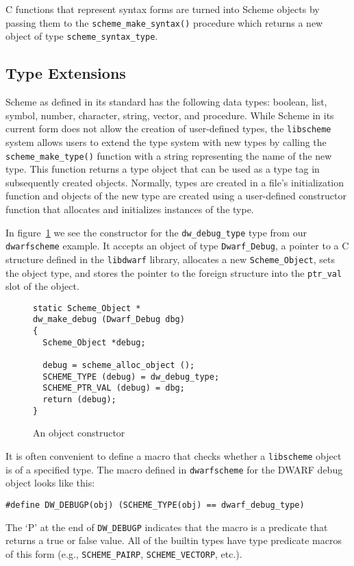 C functions that represent syntax forms are turned into Scheme objects
by passing them to the \verb+scheme_make_syntax()+ procedure which
returns a new object of type \verb+scheme_syntax_type+.

\subsection{Type Extensions}

Scheme as defined in its standard has the following data types:
boolean, list, symbol, number, character, string, vector, and
procedure.  While Scheme in its current form does not allow the
creation of user-defined types, the \verb+libscheme+ system allows
users to extend the type system with new types by calling the
\verb+scheme_make_type()+ function with a string representing the name
of the new type.  This function returns a type object that can be used
as a type tag in subsequently created objects.  Normally, types are
created in a file's initialization function and objects of the new
type are created using a user-defined constructor function that
allocates and initializes instances of the type.

In figure~\ref{fig:constr} we see the constructor for the
\verb+dw_debug_type+ type from our \verb+dwarfscheme+ example.  It
accepts an object of type \verb+Dwarf_Debug+, a pointer to a C
structure defined in the \verb+libdwarf+ library, allocates a new
\verb+Scheme_Object+, sets the object type, and stores the pointer to
the foreign structure into the \verb+ptr_val+ slot of the object.

\begin{figure}[htbp]
\begin{center}
\begin{verbatim}
static Scheme_Object *
dw_make_debug (Dwarf_Debug dbg)
{
  Scheme_Object *debug;

  debug = scheme_alloc_object ();
  SCHEME_TYPE (debug) = dw_debug_type;
  SCHEME_PTR_VAL (debug) = dbg;
  return (debug);
}
\end{verbatim}
\end{center}
  \caption{An object constructor}
  \label{fig:constr}
\end{figure}

It is often convenient to define a macro that checks whether a
\verb+libscheme+ object is of a specified type.  The macro defined in
\verb+dwarfscheme+ for the DWARF debug object looks like this:
\begin{verbatim}
#define DW_DEBUGP(obj) (SCHEME_TYPE(obj) == dwarf_debug_type)
\end{verbatim}
The `P' at the end of \verb+DW_DEBUGP+ indicates that the macro is
a predicate that returns a true or false value.  All of the builtin
types have type predicate macros of this form (e.g.,
\verb+SCHEME_PAIRP+, \verb+SCHEME_VECTORP+, etc.).

